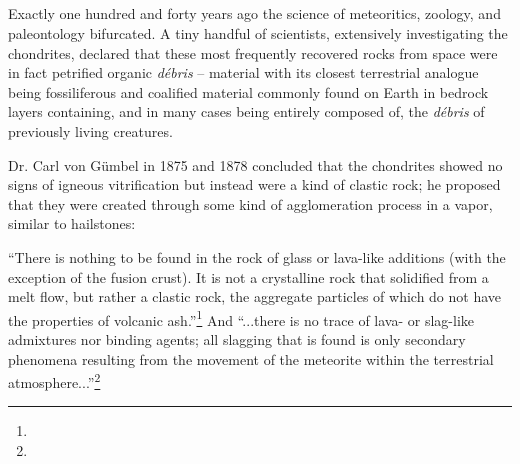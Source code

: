 \documentclass[a4paper, 12pt, oneside]{article}
\begin{document}
\subsection{}
\paragraph*{}
Exactly one hundred and forty years ago the science of meteoritics, zoology, and paleontology bifurcated. A tiny handful of scientists, extensively investigating the chondrites, declared that these most frequently recovered rocks from space were in fact petrified organic \emph{débris} -- material with its closest terrestrial analogue being fossiliferous and coalified material commonly found on Earth in bedrock layers containing, and in many cases being entirely composed of, the \emph{débris} of previously living creatures.

Dr. Carl von Gümbel in 1875 and 1878 concluded that the chondrites showed no signs of igneous vitrification but instead were a kind of clastic rock; he proposed that they were created through some kind of agglomeration process in a vapor, similar to hailstones:
\begin{displayquote}
``There is nothing to be found in the rock of glass or lava-like additions (with the exception of the fusion crust). It is not a crystalline rock that solidified from a melt flow, but rather a clastic rock, the aggregate particles of which do not have the properties of volcanic ash.''\footnote{} And ``...there is no trace of lava- or slag-like admixtures nor binding agents; all slagging that is found is only secondary phenomena resulting from the movement of the meteorite within the terrestrial atmosphere...''\footnote{}
\end{displayquote}
\end{document}
